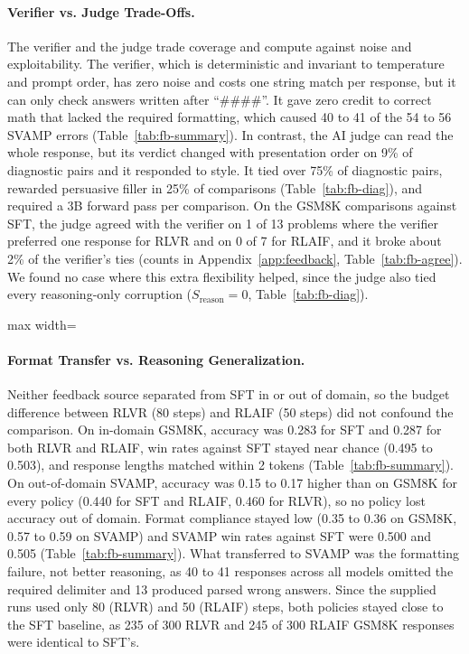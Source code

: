 \documentclass{article}
\newcommand{\tablebody}[1]{\small\setlength{\tabcolsep}{4pt}\begin{adjustbox}{max width=\linewidth}\end{adjustbox}}
\begin{document}
\paragraph{Verifier vs. Judge Trade-Offs.} The verifier and the judge trade coverage and compute against noise and exploitability. The verifier, which is deterministic and invariant to temperature and prompt order, has zero noise and costs one string match per response, but it can only check answers written after ``\#\#\#\#''. It gave zero credit to correct math that lacked the required formatting, which caused 40 to 41 of the 54 to 56 SVAMP errors (Table~\ref{tab:fb-summary}). In contrast, the AI judge can read the whole response, but its verdict changed with presentation order on 9\% of diagnostic pairs and it responded to style. It tied over 75\% of diagnostic pairs, rewarded persuasive filler in 25\% of comparisons (Table~\ref{tab:fb-diag}), and required a 3B forward pass per comparison. On the GSM8K comparisons against SFT, the judge agreed with the verifier on 1 of 13 problems where the verifier preferred one response for RLVR and on 0 of 7 for RLAIF, and it broke about 2\% of the verifier's ties (counts in Appendix~\ref{app:feedback}, Table~\ref{tab:fb-agree}). We found no case where this extra flexibility helped, since the judge also tied every reasoning-only corruption ($S_{\text{reason}} = 0$, Table~\ref{tab:fb-diag}).

\begin{table}[!htb]
  \centering
  \caption{GSM8K (300) and SVAMP (100) results with greedy decoding and a 512-token cap. Failures splits SVAMP errors into wrong answer, no ``\#\#\#\#'' line, unparsable and truncated. Neither policy separated from SFT, and most errors were format failures.}
  \label{tab:fb-summary}
  \tablebody{tables/t5_summary.tex}
\end{table}

\paragraph{Format Transfer vs. Reasoning Generalization.} Neither feedback source separated from SFT in or out of domain, so the budget difference between RLVR (80 steps) and RLAIF (50 steps) did not confound the comparison. On in-domain GSM8K, accuracy was 0.283 for SFT and 0.287 for both RLVR and RLAIF, win rates against SFT stayed near chance (0.495 to 0.503), and response lengths matched within 2 tokens (Table~\ref{tab:fb-summary}). On out-of-domain SVAMP, accuracy was 0.15 to 0.17 higher than on GSM8K for every policy (0.440 for SFT and RLAIF, 0.460 for RLVR), so no policy lost accuracy out of domain. Format compliance stayed low (0.35 to 0.36 on GSM8K, 0.57 to 0.59 on SVAMP) and SVAMP win rates against SFT were 0.500 and 0.505 (Table~\ref{tab:fb-summary}). What transferred to SVAMP was the formatting failure, not better reasoning, as 40 to 41 responses across all models omitted the required delimiter and 13 produced parsed wrong answers. Since the supplied runs used only 80 (RLVR) and 50 (RLAIF) steps, both policies stayed close to the SFT baseline, as 235 of 300 RLVR and 245 of 300 RLAIF GSM8K responses were identical to SFT's.
\end{document}
